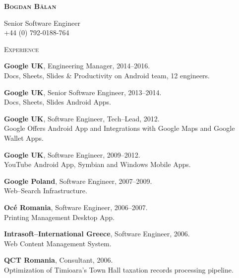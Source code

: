 \documentclass[10pt]{article}
\begin{document}
\noindent
\textcolor{Primary}{\textbf {\huge {\textsc{Bogdan B\u{a}lan}}}}

\vspace{0.16in}

\noindent
Senior Software Engineer \\
+44 (0) 792-0188-764 \\

\vspace{0.32in}

\noindent
\textcolor{Primary}{{\large \textsc{Experience}}}

\begin{list}{}{\leftmargin=0em}

\item
{\bf Google UK}, Engineering Manager, 2014--2016.\\
Docs, Sheets, Slides \& Productivity on Android team, 12 engineers.

\item
{\bf Google UK}, Senior Software Engineer, 2013--2014.\\
Docs, Sheets, Slides Android Apps.

\item
{\bf Google UK}, Software Engineer, Tech--Lead, 2012.\\
Google Offers Android App and Integrations with Google Maps and Google Wallet Apps.

\item
{\bf Google UK}, Software Engineer, 2009--2012.\\
YouTube Android App, Symbian and Windows Mobile Apps.

\item
{\bf Google Poland}, Software Engineer, 2007--2009.\\
Web--Search Infrastructure.

\item
{\bf Oc\'e Romania}, Software Engineer, 2006--2007.\\
Printing Management Desktop App.

\item
{\bf Intrasoft--International Greece}, Software Engineer, 2006.\\
Web Content Management System.

\item
{\bf QCT Romania}, Consultant, 2006.\\
Optimization of Timioara's Town Hall taxation records processing pipeline.


\end{list}
\end{document}
